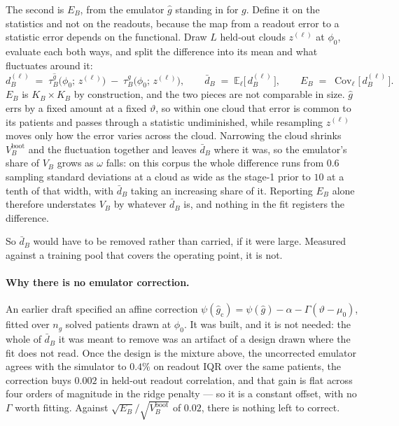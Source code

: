 \documentclass[11pt]{article}
\DeclareMathOperator*{\Cov}{Cov}
\begin{document}
The second is $E_B$, from the emulator $\widehat g$ standing in for $g$. Define
it on the statistics and not on the readouts, because the map from a readout
error to a statistic error depends on the functional. Draw $L$ held-out clouds
$z^{(\ell)}$ at $\phi_0$, evaluate each both ways, and split the difference into
its mean and what fluctuates around it:
\begin{equation}
d^{(\ell)}_B
\;=\;
\tau^{\widehat g}_B\big(\phi_0;\,z^{(\ell)}\big)
\;-\;
\tau^{g}_B\big(\phi_0;\,z^{(\ell)}\big),
\qquad
\bar d_B \;=\; \mathbb{E}_{\ell}\big[\,d^{(\ell)}_B\,\big],
\qquad
E_B \;=\; \Cov_{\ell}\big[\,d^{(\ell)}_B\,\big] .
\label{eq:Ec}
\end{equation}
$E_B$ is $K_B\times K_B$ by construction, and the two pieces are not comparable
in size. $\widehat g$ errs by a fixed amount at a fixed $\vartheta$, so within one
cloud that error is common to its patients and passes through a statistic
undiminished, while resampling $z^{(\ell)}$ moves only how the error varies across
the cloud. Narrowing the cloud shrinks $V^{\text{boot}}_B$ and the fluctuation
together and leaves $\bar d_B$ where it was, so the emulator's share of $V_B$
grows as $\omega$ falls: on this corpus the whole difference runs from $0.6$
sampling standard deviations at a cloud as wide as the stage-1 prior to $10$ at a
tenth of that width, with $\bar d_B$ taking an increasing share of it. Reporting
$E_B$ alone therefore understates $V_B$ by whatever $\bar d_B$ is, and nothing in
the fit registers the difference.

So $\bar d_B$ would have to be removed rather than carried, if it were large.
Measured against a training pool that covers the operating point, it is not.

\paragraph{Why there is no emulator correction.} An earlier draft specified an
affine correction $\psi(\widehat g_{\mathrm{c}}) = \psi(\widehat g) - \alpha -
\Gamma(\vartheta-\mu_0)$, fitted over $n_g$ solved patients drawn at $\phi_0$.
It was built, and it is not needed: the whole of $\bar d_B$ it was meant to
remove was an artifact of a design drawn where the fit does not read. Once the
design is the mixture above, the uncorrected emulator agrees with the simulator
to $0.4\%$ on readout IQR over the same patients, the correction buys $0.002$ in
held-out readout correlation, and that gain is flat across four orders of
magnitude in the ridge penalty --- so it is a constant offset, with no $\Gamma$
worth fitting. Against $\sqrt{E_B}/\sqrt{V^{\text{boot}}_B}$ of $0.02$, there is
nothing left to correct.
\end{document}
